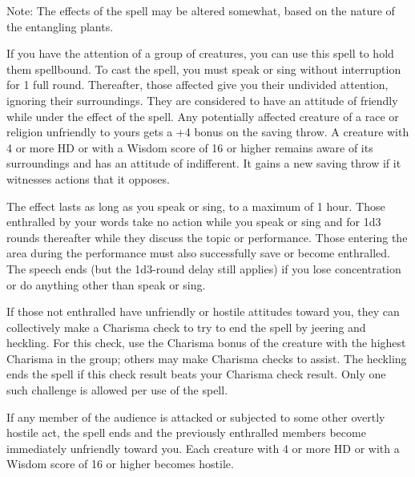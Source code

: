 \begin{multicols}{2}
\begin{small}
\smallskip\noindent Note: The effects of the spell may be altered somewhat, based on the nature of the entangling plants.

\noindent If you have the attention of a group of creatures, you can use this spell to hold them spellbound. To cast the spell, you must speak or sing without interruption for 1 full round. Thereafter, those affected give you their undivided attention, ignoring their surroundings. They are considered to have an attitude of friendly while under the effect of the spell. Any potentially affected creature of a race or religion unfriendly to yours gets a +4 bonus on the saving throw.
\smallskip\noindent A creature with 4 or more HD or with a Wisdom score of 16 or higher remains aware of its surroundings and has an attitude of indifferent. It gains a new saving throw if it witnesses actions that it opposes.

\smallskip\noindent The effect lasts as long as you speak or sing, to a maximum of 1 hour. Those enthralled by your words take no action while you speak or sing and for 1d3 rounds thereafter while they discuss the topic or performance. Those entering the area during the performance must also successfully save or become enthralled. The speech ends (but the 1d3-round delay still applies) if you lose concentration or do anything other than speak or sing.

\smallskip\noindent If those not enthralled have unfriendly or hostile attitudes toward you, they can collectively make a Charisma check to try to end the spell by jeering and heckling. For this check, use the Charisma bonus of the creature with the highest Charisma in the group; others may make Charisma checks to assist. The heckling ends the spell if this check result beats your Charisma check result. Only one such challenge is allowed per use of the spell.

\smallskip\noindent If any member of the audience is attacked or subjected to some other overtly hostile act, the spell ends and the previously enthralled members become immediately unfriendly toward you. Each creature with 4 or more HD or with a Wisdom score of 16 or higher becomes hostile.


\end{small}
\end{multicols}
